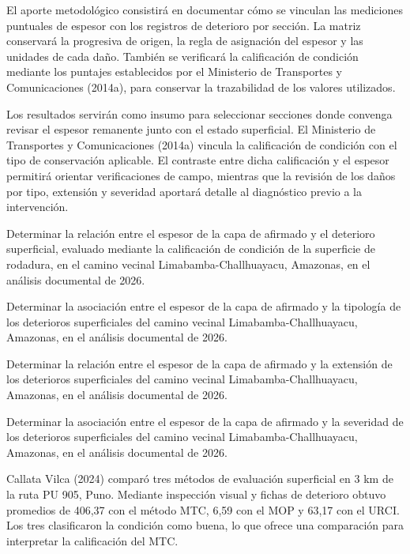 \documentclass[12pt,a4paper]{article}
\begin{document}
El aporte metodológico consistirá en documentar cómo se vinculan las mediciones puntuales de espesor con los registros de deterioro por sección. La matriz conservará la progresiva de origen, la regla de asignación del espesor y las unidades de cada daño. También se verificará la calificación de condición mediante los puntajes establecidos por el Ministerio de Transportes y Comunicaciones (2014a), para conservar la trazabilidad de los valores utilizados.

Los resultados servirán como insumo para seleccionar secciones donde convenga revisar el espesor remanente junto con el estado superficial. El Ministerio de Transportes y Comunicaciones (2014a) vincula la calificación de condición con el tipo de conservación aplicable. El contraste entre dicha calificación y el espesor permitirá orientar verificaciones de campo, mientras que la revisión de los daños por tipo, extensión y severidad aportará detalle al diagnóstico previo a la intervención.

Determinar la relación entre el espesor de la capa de afirmado y el deterioro superficial, evaluado mediante la calificación de condición de la superficie de rodadura, en el camino vecinal Limabamba-Challhuayacu, Amazonas, en el análisis documental de 2026.

\begin{listaTrasTitulo}
\item Determinar la asociación entre el espesor de la capa de afirmado y la tipología de los deterioros superficiales del camino vecinal Limabamba-Challhuayacu, Amazonas, en el análisis documental de 2026.
\item Determinar la relación entre el espesor de la capa de afirmado y la extensión de los deterioros superficiales del camino vecinal Limabamba-Challhuayacu, Amazonas, en el análisis documental de 2026.
\item Determinar la asociación entre el espesor de la capa de afirmado y la severidad de los deterioros superficiales del camino vecinal Limabamba-Challhuayacu, Amazonas, en el análisis documental de 2026.
\end{listaTrasTitulo}


Callata Vilca (2024) comparó tres métodos de evaluación superficial en 3 km de la ruta PU 905, Puno. Mediante inspección visual y fichas de deterioro obtuvo promedios de 406,37 con el método MTC, 6,59 con el MOP y 63,17 con el URCI. Los tres clasificaron la condición como buena, lo que ofrece una comparación para interpretar la calificación del MTC.
\end{document}
